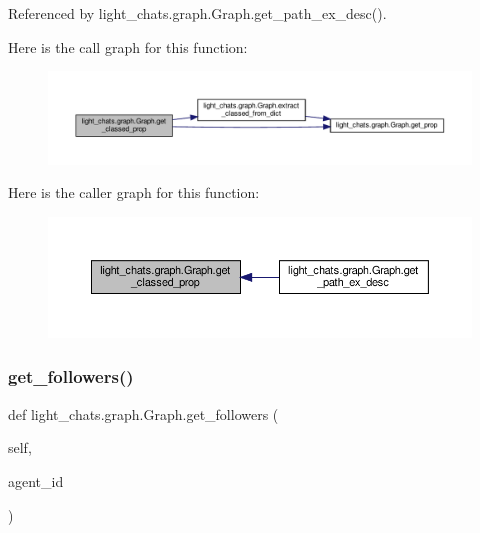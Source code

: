 Referenced by light\+\_\+chats.\+graph.\+Graph.\+get\+\_\+path\+\_\+ex\+\_\+desc().

Here is the call graph for this function\+:
\nopagebreak
\begin{figure}[H]
\begin{center}
\leavevmode
\includegraphics[width=350pt]{classlight__chats_1_1graph_1_1Graph_a33e205ecb0e7d4d2626162250ef585f1_cgraph}
\end{center}
\end{figure}
Here is the caller graph for this function\+:
\nopagebreak
\begin{figure}[H]
\begin{center}
\leavevmode
\includegraphics[width=350pt]{classlight__chats_1_1graph_1_1Graph_a33e205ecb0e7d4d2626162250ef585f1_icgraph}
\end{center}
\end{figure}
\mbox{\label{classlight__chats_1_1graph_1_1Graph_add43b11ac4acd2b8db044599c492564a}} 
\subsubsection{\texorpdfstring{get\+\_\+followers()}{get\_followers()}}
{\footnotesize\ttfamily def light\+\_\+chats.\+graph.\+Graph.\+get\+\_\+followers (\begin{DoxyParamCaption}\item[{}]{self,  }\item[{}]{agent\+\_\+id }\end{DoxyParamCaption})}

